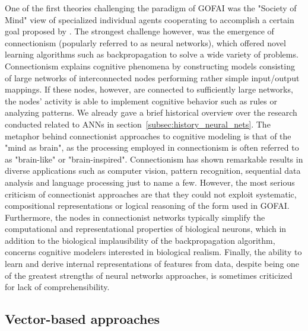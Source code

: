 One of the first theories challenging the paradigm of \ac{GOFAI} was the "Society of Mind" view of specialized individual agents cooperating to accomplish a certain goal proposed by \textcite{Minsky1986}.
The strongest challenge however, was the emergence of connectionism \parencite{Rumelhart1986a} (popularly referred to as neural networks), which offered novel learning algorithms such as backpropagation \parencite{Rumelhart1986} to solve a wide variety of problems.
Connectionism explains cognitive phenomena by constructing models consisting of large networks of interconnected nodes performing rather simple input/output mappings.
If these nodes, however, are connected to sufficiently large networks, the nodes' activity is able to implement cognitive behavior such as rules or analyzing patterns.
We already gave a brief historical overview over the research conducted related to \acp{ANN} in section~\ref{subsec:history_neural_nets}. 
The metaphor behind connectionist approaches to cognitive modeling is that of the "mind as brain", as the processing employed in connectionism is often referred to as "brain-like" or "brain-inspired".
Connectionism has shown remarkable results in diverse applications such as computer vision, pattern recognition, sequential data analysis and language processing just to name a few.
However, the most serious criticism of connectionist approaches are that they could not exploit systematic, compositional representations or logical reasoning of the form used in \ac{GOFAI}. 
Furthermore, the nodes in connectionist networks typically simplify the computational and representational properties of biological neurons, which in addition to the biological implausibility of the backpropagation algorithm, concerns cognitive modelers interested in biological realism.
Finally, the ability to learn and derive internal representations of features from data, despite being one of the greatest strengths of neural networks approaches, is sometimes criticized for lack of comprehensibility.

\subsection{Vector-based approaches}%
\label{subsec:vector_based_approaches}

